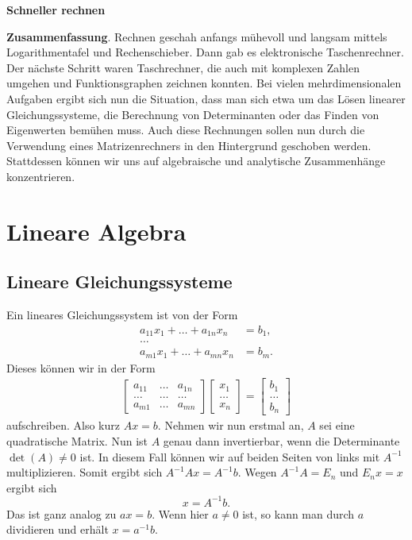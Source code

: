 \documentclass[a4paper,11pt,fleqn]{article}
\begin{document}
\noindent
{\huge\textbf{Schneller rechnen}}

\tableofcontents
\vspace{4mm}

\noindent
\textbf{Zusammenfassung}. Rechnen geschah anfangs mühevoll und
langsam mittels Logarithmentafel und Rechenschieber. Dann gab
es elektronische Taschenrechner. Der nächste Schritt waren
Taschrechner, die auch mit komplexen Zahlen umgehen und
Funktionsgraphen zeichnen konnten.
Bei vielen mehrdimensionalen Aufgaben ergibt sich nun die Situation,
dass man sich etwa um das Lösen linearer Gleichungssysteme, die
Berechnung von Determinanten oder das Finden von Eigenwerten
bemühen muss. Auch diese Rechnungen sollen nun durch die
Verwendung eines Matrizenrechners in den Hintergrund geschoben
werden. Stattdessen können wir uns auf algebraische und analytische
Zusammenhänge konzentrieren.

\section{Lineare Algebra}
\subsection{Lineare Gleichungssysteme}
Ein lineares Gleichungssystem ist von der Form
\begin{align*}
a_{11}x_1+\ldots+a_{1n}x_n &= b_1,\\
\ldots\\
a_{m1}x_1+\ldots+a_{mn}x_n &= b_m.
\end{align*}
Dieses können wir in der Form
\begin{gather*}
\begin{bmatrix}
a_{11} &\ldots & a_{1n}\\
\ldots &\ldots & \ldots\\
a_{m1} &\ldots & a_{mn}
\end{bmatrix}
\begin{bmatrix}
x_1\\ \ldots\\ x_n
\end{bmatrix}
= \begin{bmatrix}
b_1\\ \ldots\\ b_n
\end{bmatrix}
\end{gather*}
aufschreiben. Also kurz \(Ax=b\). Nehmen wir nun erstmal
an, \(A\) sei eine quadratische Matrix. Nun ist \(A\) genau
dann invertierbar, wenn die Determinante \(\det(A)\ne 0\) ist. In diesem Fall
können wir auf beiden Seiten von links mit \(A^{-1}\) multiplizieren.
Somit ergibt sich \(A^{-1}Ax=A^{-1}b\). Wegen \(A^{-1}A=E_n\) und
\(E_n x=x\) ergibt sich
\[x=A^{-1}b.\]
Das ist ganz analog zu \(ax=b\). Wenn hier \(a\ne 0\) ist, so kann
man durch \(a\) dividieren und erhält \(x=a^{-1}b\).
\end{document}
